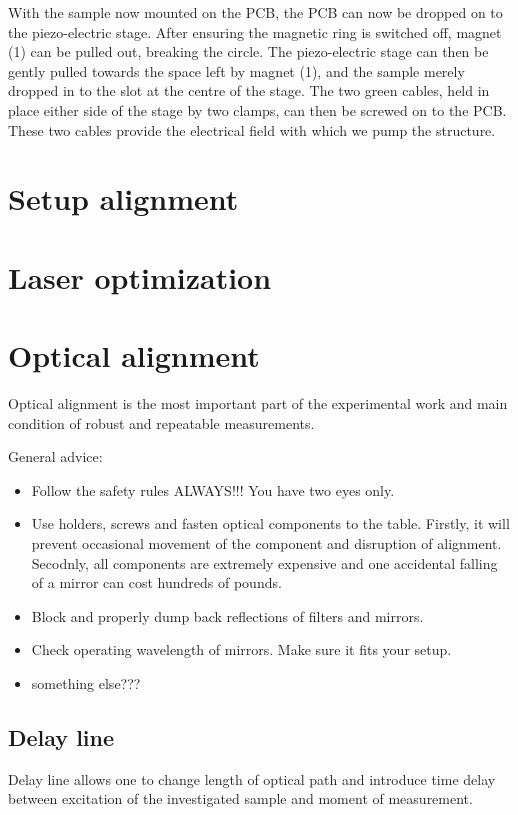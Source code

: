 \documentclass[14pt,a4paper] {article}
\begin{document}
With the sample now mounted on the PCB, the PCB can now be dropped on to the piezo-electric stage. After ensuring the magnetic ring is switched off, magnet (1) can be pulled out, breaking the circle. The piezo-electric stage can then be gently pulled towards the space left by magnet (1), and the sample merely dropped in to the slot at the centre of the stage. The two green cables, held in place either side of the stage by two clamps, can then be screwed on to the PCB. These two cables provide the electrical field with which we pump the structure.


\section{Setup alignment}

\section{Laser optimization}

\section{Optical alignment}
Optical alignment is the most important part of the experimental work and main condition of robust and repeatable measurements.

General advice:
\begin{itemize}
\item Follow the safety rules ALWAYS!!! You have two eyes only.
\item Use holders, screws and fasten optical components to the table. Firstly, it will prevent occasional movement of the component and disruption of alignment. Secodnly, all components are extremely expensive and one accidental falling of a mirror can cost hundreds of pounds.
\item Block and properly dump back reflections of filters and mirrors.
\item Check operating wavelength of mirrors. Make sure it fits your setup.
\item something else???   
\end{itemize}

\subsection{Delay line}
Delay line allows one to change length of optical path and introduce time delay between excitation of the investigated sample and moment of measurement.
\end{document}
